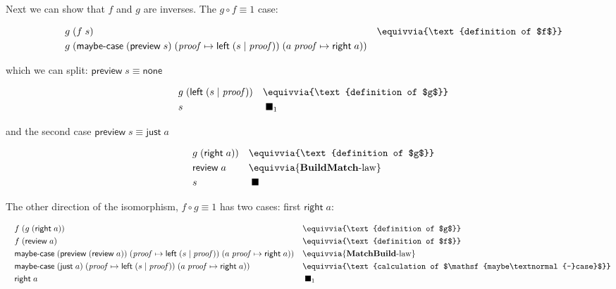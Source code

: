 \documentclass{article}
\begin{document}
Next we can show that $f$ and $g$ are inverses. The $g \circ f \equiv 1$ case:

\begin{equation}
\begin{aligned}
\quad & g\; (f\; s)          &&\equivvia{\text{definition of $f$}} \\
      & g\; (\mathsf{maybe\textnormal{-}case}\;(\mathsf{preview}\;s)\; (\mathit{proof} \mapsto \mathsf{left}\;(s \mid \mathit{proof}))\; (a\; \mathit{proof} \mapsto \mathsf{right}\; a)) \\
\end{aligned}
\end{equation}

which we can split: $\mathsf{preview}\;s \equiv \mathsf{none}$

\begin{equation}
\begin{aligned}
\quad & g\; (\mathsf{left}\; (s \mid \mathit{proof}))  &&\equivvia{\text{definition of $g$}} \\
      & s &&\;\blacksquare_1
\end{aligned}
\end{equation}

and the second case $\mathsf{preview}\;s \equiv \mathsf{just}\;a$

\begin{equation}
\begin{aligned}
\quad & g\; (\mathsf{right}\;a))  &&\equivvia{\text{definition of $g$}} \\
      & \mathsf{review}\;a &&\equivvia{\text{\textbf{BuildMatch}-law}} \\
      & s &&\;\blacksquare
\end{aligned}
\end{equation}

The other direction of the isomorphism, $f \circ g \equiv 1$ has two cases:
first $\mathsf{right}\; a$:

\begin{equation}
\begin{aligned}
\quad & f\; (g\; (\mathsf{right}\;a))          &&\equivvia{\text{definition of $g$}} \\
      & f\; (\mathsf{review}\;a)               &&\equivvia{\text{definition of $f$}} \\
      & \mathsf{maybe\textnormal{-}case}\;(\mathsf{preview}\;(\mathsf{review}\;a))\; (\mathit{proof} \mapsto \mathsf{left}\;(s \mid \mathit{proof}))\; (a\; \mathit{proof} \mapsto \mathsf{right}\; a))
                                               &&\equivvia{\text{\textbf{MatchBuild}-law}} \\
      & \mathsf{maybe\textnormal{-}case}\;(\mathsf{just}\;a)\; (\mathit{proof} \mapsto \mathsf{left}\;(s \mid \mathit{proof}))\; (a\; \mathit{proof} \mapsto \mathsf{right}\; a))
                                               &&\equivvia{\text{calculation of $\mathsf{maybe\textnormal{-}case}$}} \\
      & \mathsf{right}\;a &&\;\blacksquare_1
\end{aligned}
\end{equation}
\end{document}
